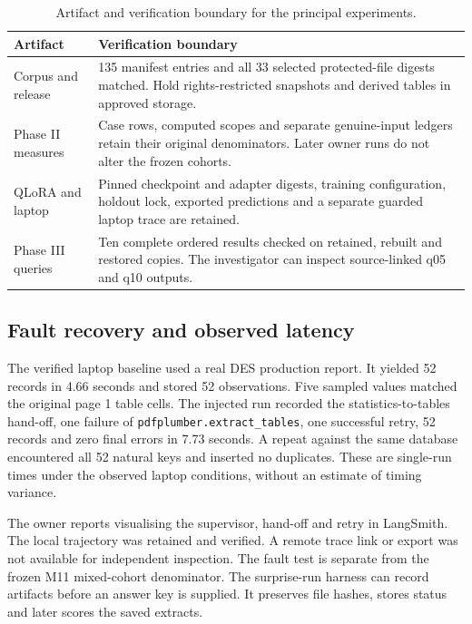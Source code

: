\documentclass[11pt,a4paper]{article}
\newcommand{\code}[1]{\texttt{#1}}
\begin{document}
\begin{table}[!ht]
\small
\caption{Artifact and verification boundary for the principal experiments.}
\begin{tabularx}{\linewidth}{@{}P{.25\linewidth}Y@{}}
\toprule
Artifact & Verification boundary\\ \midrule
Corpus and release & 135 manifest entries and all 33 selected protected-file digests matched. Hold rights-restricted snapshots and derived tables in approved storage.\\
Phase II measures & Case rows, computed scopes and separate genuine-input ledgers retain their original denominators. Later owner runs do not alter the frozen cohorts.\\
QLoRA and laptop & Pinned checkpoint and adapter digests, training configuration, holdout lock, exported predictions and a separate guarded laptop trace are retained.\\
Phase III queries & Ten complete ordered results checked on retained, rebuilt and restored copies. The investigator can inspect source-linked q05 and q10 outputs.\\
\bottomrule
\end{tabularx}
\end{table}

\subsection{Fault recovery and observed latency}
The verified laptop baseline used a real DES production report. It yielded 52 records in 4.66 seconds and stored 52 observations. Five sampled values matched the original page 1 table cells. The injected run recorded the statistics-to-tables hand-off, one failure of \code{pdfplumber.extract\_tables}, one successful retry, 52 records and zero final errors in 7.73 seconds. A repeat against the same database encountered all 52 natural keys and inserted no duplicates. These are single-run times under the observed laptop conditions, without an estimate of timing variance.

The owner reports visualising the supervisor, hand-off and retry in LangSmith. The local trajectory was retained and verified. A remote trace link or export was not available for independent inspection. The fault test is separate from the frozen M11 mixed-cohort denominator. The surprise-run harness can record artifacts before an answer key is supplied. It preserves file hashes, stores status and later scores the saved extracts.
\end{document}

